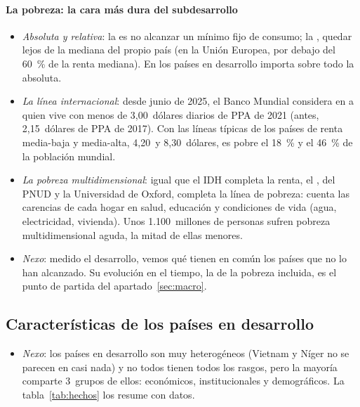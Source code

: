 \documentclass[11pt]{article}
\begin{document}
\paragraph{La pobreza: la cara más dura del subdesarrollo}

\begin{itemize}
\item \emph{Absoluta y relativa}: la  es no alcanzar un mínimo fijo de consumo; la , quedar lejos de la mediana del propio país (en la Unión Europea, por debajo del 60~\% de la renta mediana). En los países en desarrollo importa sobre todo la absoluta.
\item \emph{La línea internacional}: desde junio de 2025, el Banco Mundial considera en  a quien vive con menos de 3,00~dólares diarios de PPA de 2021 (antes, 2,15~dólares de PPA de 2017). Con las líneas típicas de los países de renta media-baja y media-alta, 4,20~y 8,30~dólares, es pobre el 18~\% y el 46~\% de la población mundial\nocite{BM2026PIP}.
\item \emph{La pobreza multidimensional}: igual que el IDH completa la renta, el , del PNUD y la Universidad de Oxford, completa la línea de pobreza: cuenta las carencias de cada hogar en salud, educación y condiciones de vida (agua, electricidad, vivienda). Unos 1.100~millones de personas sufren pobreza multidimensional aguda, la mitad de ellas menores\nocite{PNUD2025IPM}.
\item \emph{Nexo}: medido el desarrollo, vemos qué tienen en común los países que no lo han alcanzado. Su evolución en el tiempo, la de la pobreza incluida, es el punto de partida del apartado~\ref{sec:macro}.
\end{itemize}

\subsection{Características de los países en desarrollo}\label{sec:caracteristicas}

\begin{itemize}
\item \emph{Nexo}: los países en desarrollo son muy heterogéneos (Vietnam y Níger no se parecen en casi nada) y no todos tienen todos los rasgos, pero la mayoría comparte 3~grupos de ellos: económicos, institucionales y demográficos. La tabla~\ref{tab:hechos} los resume con datos.
\end{itemize}
\end{document}

